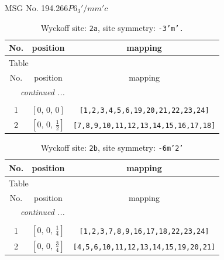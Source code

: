 \documentclass[fleqn,8pt]{jsarticle}
\begin{document}
\setcounter{MaxMatrixCols}{32}

\renewcommand{\tablename}{Table~}
\renewcommand{\figurename}{Figure~}
\begin{center}
\LARGE
MSG No. 194.266\quad$P6_{3}'/mm'c$
\end{center}
\renewcommand{\arraystretch}{1.2}
\begin{longtable}{ccc}
\caption{Wyckoff site: {\tt 2a}, site symmetry: {\tt -3'm'.}}
 \\
 \hline \hline
No. & position & mapping \\ \hline \endfirsthead

\multicolumn{2}{l}{\tablename\ \thetable{}} \\
 \hline \hline
No. & position & mapping \\ \hline \endhead

 \hline \hline
\multicolumn{2}{r}{\footnotesize\it continued ...} \\ \endfoot

 \hline \hline
\multicolumn{2}{r}{} \\ \endlastfoot

1 & $\left[ 0,\, 0,\, 0 \right]$ & {\tt [1,2,3,4,5,6,19,20,21,22,23,24]} \\ \hline
2 & $\left[ 0,\, 0,\, \frac{1}{2} \right]$ & {\tt [7,8,9,10,11,12,13,14,15,16,17,18]} \\
\end{longtable}
\renewcommand{\arraystretch}{1.2}
\begin{longtable}{ccc}
\caption{Wyckoff site: {\tt 2b}, site symmetry: {\tt -6m'2'}}
 \\
 \hline \hline
No. & position & mapping \\ \hline \endfirsthead

\multicolumn{2}{l}{\tablename\ \thetable{}} \\
 \hline \hline
No. & position & mapping \\ \hline \endhead

 \hline \hline
\multicolumn{2}{r}{\footnotesize\it continued ...} \\ \endfoot

 \hline \hline
\multicolumn{2}{r}{} \\ \endlastfoot

1 & $\left[ 0,\, 0,\, \frac{1}{4} \right]$ & {\tt [1,2,3,7,8,9,16,17,18,22,23,24]} \\ \hline
2 & $\left[ 0,\, 0,\, \frac{3}{4} \right]$ & {\tt [4,5,6,10,11,12,13,14,15,19,20,21]} \\
\end{longtable}
\end{document}
